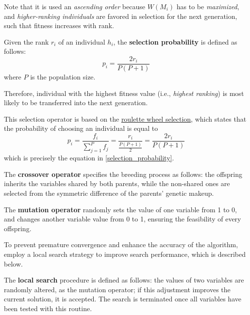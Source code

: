 Note that it is used an \textit{ascending order} because $W(M_i)$ has to be \textit{maximized}, and \textit{higher-ranking individuals} are favored in selection for the next generation, such that fitness increases with rank.

\begin{definition} \label{selection_probability}
    Given the rank $r_i$ of an individual $h_i$, the \textbf{selection probability} is defined as follows: $$p_i = \dfrac{2r_i}{P(P + 1)}$$ where $P$ is the population size.
\end{definition}

Therefore, individual with the highest fitness value (i.e., \textit{highest ranking}) is most likely to be transferred into the next generation.

This selection operator is based on the \href{https://en.wikipedia.org/wiki/Selection_(genetic_algorithm)#Roulette_wheel_selection}{roulette wheel selection}, which states that the probability of choosing an individual is equal to $$p_i = \dfrac{f_i}{\sum_{j = 1}^P {f_j}} = \dfrac{r_i}{\frac{P(P + 1)}{2}} = \dfrac{2r_i}{P(P+1)}$$ which is precisely the equation in \cref{selection_probability}.

\begin{definition}
    The \textbf{crossover operator} specifies the breeding process as follows: the offspring inherits the variables shared by both parents, while the non-shared ones are selected from the symmetric difference of the parents' genetic makeup.
\end{definition}

\begin{definition}
    The \textbf{mutation operator} randomly sets the value of one variable from 1 to 0, and changes another variable value from 0 to 1, ensuring the feasibility of every offspring.
\end{definition}

To prevent premature convergence and enhance the accuracy of the algorithm, \textcite{mdpfinder} employ a local search strategy to improve search performance, which is described below.

\begin{definition}
    The \textbf{local search} procedure is defined as follows: the values of two variables are randomly altered, as the mutation operator; if this adjustment improves the current solution, it is accepted. The search is terminated once all variables have been tested with this routine.
\end{definition}

